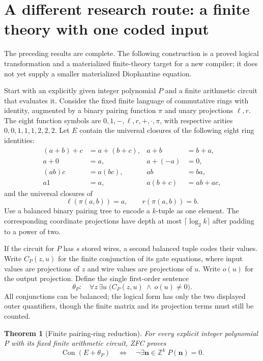 \documentclass[11pt]{article}
\newtheorem{theorem}{Theorem}[section]
\theoremstyle{remark}\newtheorem{remark}[theorem]{Remark}
\newcommand{\Z}{\mathbb Z}
\newcommand{\Con}{\operatorname{Con}}
\begin{document}
\section{A different research route: a finite theory with one coded input}
\label{sec:grounding}

The preceding results are complete. The following construction is a
proved logical transformation and a materialized finite-theory target
for a new compiler; it does not yet supply a smaller materialized
Diophantine equation.

Start with an explicitly given integer polynomial $P$ and a finite
arithmetic circuit that evaluates it. Consider the fixed finite language
of commutative rings with identity, augmented by a binary pairing
function $\pi$ and unary projections $\ell,r$. The eight function symbols
are $0,1,-,\ell,r,+,\cdot,\pi$, with respective arities
$0,0,1,1,1,2,2,2$. Let $E$ contain the universal closures of the following
eight ring identities:
\begin{align*}
(a+b)+c&=a+(b+c), & a+b&=b+a,\\
a+0&=a, & a+(-a)&=0,\\
(ab)c&=a(bc), & ab&=ba,\\
a1&=a, & a(b+c)&=ab+ac,
\end{align*}
and the universal closures of
\[
\ell(\pi(a,b))=a,\qquad r(\pi(a,b))=b.
\]
Use a balanced binary pairing tree to encode a $k$-tuple as one element.
The corresponding coordinate projections have depth at most
$\lceil\log_2 k\rceil$ after padding to a power of two.

If the circuit for $P$ has $s$ stored wires, a second balanced tuple
codes their values. Write $C_P(z,u)$ for the finite conjunction of its
gate equations, where input values are projections of $z$ and wire
values are projections of $u$. Write $o(u)$ for the output projection.
Define the single first-order sentence
\begin{equation}\label{eq:theta}
\theta_P:\quad \forall z\,\exists u\;
\bigl(C_P(z,u)\ \wedge\ o(u)\ne0\bigr).
\end{equation}
All conjunctions can be balanced; the logical form has only the two
displayed outer quantifiers, though the finite matrix and its projection
terms must still be counted.

\begin{theorem}[Finite pairing-ring reduction]\label{thm:ring}
For every explicit integer polynomial $P$ with its fixed finite
arithmetic circuit, ZFC proves
\[
\Con(E+\theta_P)
\quad\Longleftrightarrow\quad
\neg\exists\boldsymbol n\in\Z^k\;P(\boldsymbol n)=0.
\]
\end{theorem}
\end{document}
